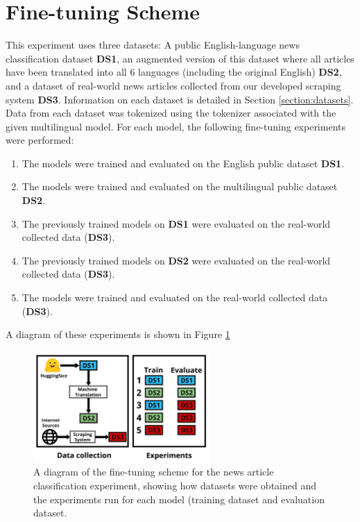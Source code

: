 \documentclass{l4proj}
\begin{document}
\section{Fine-tuning Scheme}
This experiment uses three datasets: A public English-language news classification dataset \textbf{DS1}, an augmented version of this dataset where all articles have been translated into all 6 languages (including the original English) \textbf{DS2}, and a dataset of real-world news articles collected from our developed scraping system \textbf{DS3}. 
Information on each dataset is detailed in Section \ref{section:datasets}. Data from each dataset was tokenized using the tokenizer associated with the given multilingual model. For each model, the following fine-tuning experiments were performed:
\begin{enumerate}
    \item The models were trained and evaluated on the English public dataset \textbf{DS1}. 
    \item The models were trained and evaluated on the multilingual public dataset \textbf{DS2}.
    \item The previously trained models on \textbf{DS1} were evaluated on the real-world collected data (\textbf{DS3}).
    \item The previously trained models on \textbf{DS2} were evaluated on the real-world collected data (\textbf{DS3}).
    \item The models were trained and evaluated on the real-world collected data (\textbf{DS3}).
\end{enumerate}
A diagram of these experiments is shown in Figure \ref{fig:finetuning-scheme}

\begin{figure}[h]
\centering
\includegraphics[width=0.6\textwidth]{images/Finetuning Scheme.png}
\caption{A diagram of the fine-tuning scheme for the news article classification experiment, showing how datasets were obtained and the experiments run for each model (training dataset and evaluation dataset.}
\label{fig:finetuning-scheme}
\end{figure}
\end{document}
